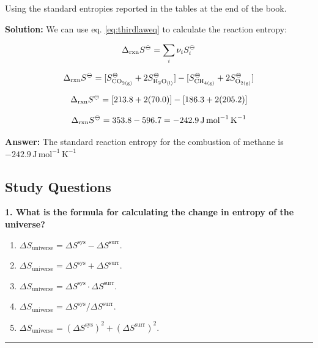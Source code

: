 \documentclass[
  9pt,
]{extbook}
\providecommand{\tightlist}{%
  \setlength{\itemsep}{0pt}\setlength{\parskip}{0pt}}
\theoremstyle{definition}
\theoremstyle{definition}
\theoremstyle{definition}
\theoremstyle{definition}
\theoremstyle{remark}
\begin{document}
Using the standard entropies reported in the tables at the end of the book.

\textbf{Solution:} We can use eq. \eqref{eq:thirdlaweq} to calculate the reaction entropy:

\[\Delta_{\text{rxn}} S^{-\kern-6pt{\ominus}\kern-6pt-}= \sum_i \nu_i S^{-\kern-6pt{\ominus}\kern-6pt-}_i\]

\[\Delta_{\text{rxn}} S^{-\kern-6pt{\ominus}\kern-6pt-}= [S^{-\kern-6pt{\ominus}\kern-6pt-}_{\text{CO}_{2\text{(g)}}} + 2S^{-\kern-6pt{\ominus}\kern-6pt-}_{\text{H}_2\text{O}_{\text{(l)}}}] - [S^{-\kern-6pt{\ominus}\kern-6pt-}_{\text{CH}_{4 \text{(g)}}} + 2S^{-\kern-6pt{\ominus}\kern-6pt-}_{\text{O}_{2\text{(g)}}}]\]

\[\Delta_{\text{rxn}} S^{-\kern-6pt{\ominus}\kern-6pt-}= [213.8 + 2(70.0)] - [186.3 + 2(205.2)]\]

\[\Delta_{\text{rxn}} S^{-\kern-6pt{\ominus}\kern-6pt-}= 353.8 - 596.7 = -242.9\,\text{J} \, \text{mol}^{-1} \, \text{K}^{-1}\]

\textbf{Answer:} The standard reaction entropy for the combustion of methane is \(-242.9\,\text{J} \, \text{mol}^{-1} \, \text{K}^{-1}\)

\subsection{Study Questions}\label{quest7}

\textbf{1. What is the formula for calculating the change in entropy of the universe?}

\begin{enumerate}
\def\labelenumi{\alph{enumi}.}
\tightlist
\item
  \(\Delta S_{\text{universe}} = \Delta S^{\text{sys}} - \Delta S^{\text{surr}}\).
\item
  \(\Delta S_{\text{universe}} = \Delta S^{\text{sys}} + \Delta S^{\text{surr}}\).
\item
  \(\Delta S_{\text{universe}} = \Delta S^{\text{sys}} \cdot \Delta S^{\text{surr}}\).
\item
  \(\Delta S_{\text{universe}} = \Delta S^{\text{sys}} / \Delta S^{\text{surr}}\).
\item
  \(\Delta S_{\text{universe}} = (\Delta S^{\text{sys}})^2 + (\Delta S^{\text{surr}})^2\).
\end{enumerate}

\begin{center}\rule{0.5\linewidth}{0.5pt}\end{center}
\end{document}
